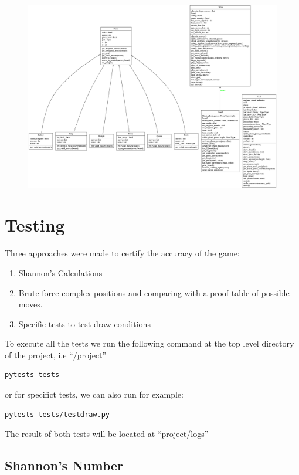 \documentclass[10pt]{article}
\begin{document}
\begin{figure}[H]
    \includegraphics[scale=0.2]{fig/classes_Chess.png}
\end{figure}


\section{Testing}

Three approaches were made to certify the accuracy of the game:

\begin{enumerate}[label=\arabic*)]
\item Shannon's Calculations
\item Brute force complex positions and comparing with a proof table of possible
    moves. 
\item Specific tests to test draw conditions
\end{enumerate}

To execute all the tests we run the following command at the top level directory of the project, i.e ``/project''
\begin{lstlisting}
pytests tests
\end{lstlisting}

or for specifict tests, we can also run for example:

\begin{lstlisting}
pytests tests/testdraw.py
\end{lstlisting}

The result of both tests will be located at ``project/logs''


\subsection{Shannon's Number}
\end{document}
